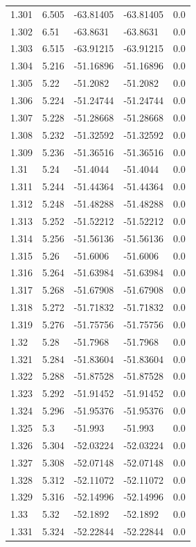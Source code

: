 \begin{tabular}{lllll}
1.301 & 6.505 & -63.81405 & -63.81405 & 0.0 \\
1.302 & 6.51 & -63.8631 & -63.8631 & 0.0 \\
1.303 & 6.515 & -63.91215 & -63.91215 & 0.0 \\
1.304 & 5.216 & -51.16896 & -51.16896 & 0.0 \\
1.305 & 5.22 & -51.2082 & -51.2082 & 0.0 \\
1.306 & 5.224 & -51.24744 & -51.24744 & 0.0 \\
1.307 & 5.228 & -51.28668 & -51.28668 & 0.0 \\
1.308 & 5.232 & -51.32592 & -51.32592 & 0.0 \\
1.309 & 5.236 & -51.36516 & -51.36516 & 0.0 \\
1.31 & 5.24 & -51.4044 & -51.4044 & 0.0 \\
1.311 & 5.244 & -51.44364 & -51.44364 & 0.0 \\
1.312 & 5.248 & -51.48288 & -51.48288 & 0.0 \\
1.313 & 5.252 & -51.52212 & -51.52212 & 0.0 \\
1.314 & 5.256 & -51.56136 & -51.56136 & 0.0 \\
1.315 & 5.26 & -51.6006 & -51.6006 & 0.0 \\
1.316 & 5.264 & -51.63984 & -51.63984 & 0.0 \\
1.317 & 5.268 & -51.67908 & -51.67908 & 0.0 \\
1.318 & 5.272 & -51.71832 & -51.71832 & 0.0 \\
1.319 & 5.276 & -51.75756 & -51.75756 & 0.0 \\
1.32 & 5.28 & -51.7968 & -51.7968 & 0.0 \\
1.321 & 5.284 & -51.83604 & -51.83604 & 0.0 \\
1.322 & 5.288 & -51.87528 & -51.87528 & 0.0 \\
1.323 & 5.292 & -51.91452 & -51.91452 & 0.0 \\
1.324 & 5.296 & -51.95376 & -51.95376 & 0.0 \\
1.325 & 5.3 & -51.993 & -51.993 & 0.0 \\
1.326 & 5.304 & -52.03224 & -52.03224 & 0.0 \\
1.327 & 5.308 & -52.07148 & -52.07148 & 0.0 \\
1.328 & 5.312 & -52.11072 & -52.11072 & 0.0 \\
1.329 & 5.316 & -52.14996 & -52.14996 & 0.0 \\
1.33 & 5.32 & -52.1892 & -52.1892 & 0.0 \\
1.331 & 5.324 & -52.22844 & -52.22844 & 0.0 \\

\end{tabular}
